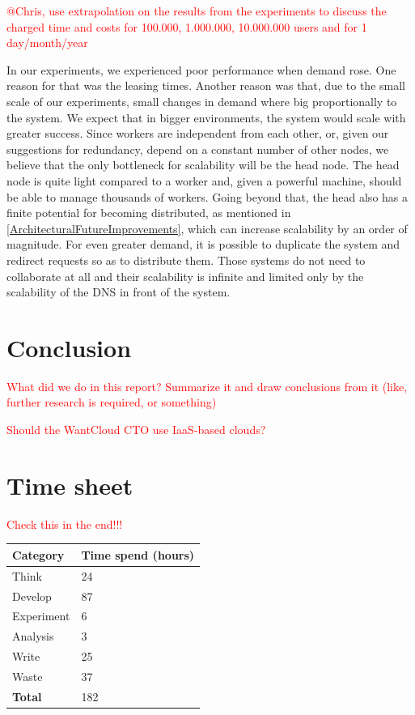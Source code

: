 \documentclass{stylesheet}
\begin{document}
\textcolor{red}{@Chris, use extrapolation on the results from the experiments to discuss the charged time and costs for 100.000, 1.000.000, 10.000.000 users and for 1 day/month/year}

In our experiments, we experienced poor performance when demand rose. One reason for that was the leasing times. Another reason was that, due to the small scale of our experiments, small changes in demand where big proportionally to the system. We expect that in bigger environments, the system would scale with greater success. Since workers are independent from each other, or, given our suggestions for redundancy, depend on a constant number of other nodes, we believe that the only bottleneck for scalability will be the head node. The head node is quite light compared to a worker and, given a powerful machine, should be able to manage thousands of workers. Going beyond that, the head also has a finite potential for becoming distributed, as mentioned in \ref{ArchitecturalFutureImprovements}, which can increase scalability by an order of magnitude. For even greater demand, it is possible to duplicate the system and redirect requests so as to distribute them. Those systems do not need to collaborate at all and their scalability is infinite and limited only by the scalability of the DNS in front of the system.

\section{Conclusion}
\label{sec:conclusion}
\textcolor{red}{What did we do in this report? Summarize it and draw conclusions from it (like, further research is required, or something)}

\textcolor{red}{Should the WantCloud CTO use IaaS-based clouds?}


\appendix
\section{Time sheet}
\label{app:time}
\textcolor{red}{Check this in the end!!!}
\begin{table}[h]
\begin{tabular}{ll}
\hline
\textbf{Category} & \textbf{Time spend (hours)} \\
\hline
Think & 24 \\
Develop & 87 \\
Experiment & 6 \\
Analysis & 3 \\
Write & 25 \\
Waste & 37 \\
\textbf{Total} & 182 \\
\hline
\end{tabular}
\end{table}
\end{document}
